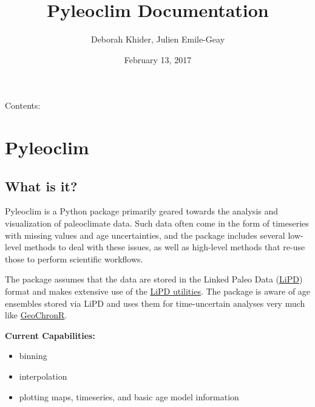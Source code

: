 \documentclass[letterpaper,10pt,english]{sphinxmanual}
\title{Pyleoclim Documentation}
\date{February 13, 2017}
\author{Deborah Khider, Julien Emile-Geay}
\begin{document}
\maketitle
\tableofcontents
{}\label{index::doc}


Contents:


\chapter{Pyleoclim}
\label{Introduction:welcome-to-pyleoclim-s-documentation}\label{Introduction::doc}\label{Introduction:pyleoclim}

\section{What is it?}
\label{Introduction:what-is-it}
Pyleoclim is a Python package primarily geared towards the analysis and visualization of paleoclimate data.
Such data often come in the form of timeseries with missing values and age uncertainties, and the package
includes several low-level methods to deal with these issues, as well as high-level methods that re-use those
to perform scientific workflows.

The package assumes that the data are stored in the Linked Paleo Data (\href{http://www.clim-past.net/12/1093/2016/}{LiPD})
format and makes extensive use of the \href{http://nickmckay.github.io/LiPD-utilities/}{LiPD utilities}. The package
is aware of age ensembles stored via LiPD and uses them for time-uncertain analyses very much like \href{http://nickmckay.github.io/GeoChronR/}{GeoChronR}.

\textbf{Current Capabilities:}
\begin{itemize}
\item {} 
binning

\item {} 
interpolation

\item {} 
plotting maps, timeseries, and basic age model information

\end{itemize}
\end{document}
